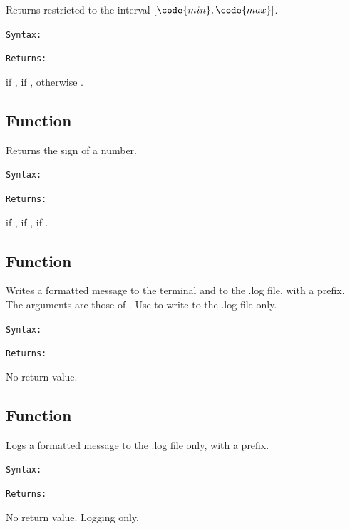 Returns  restricted to the interval $[\code{min}, \code{max}]$.

\medskip
\texttt{Syntax: }

\begin{center}
\end{center}

\medskip
\texttt{Returns: }

 if ,  if , otherwise .

\subsection{Function }
\label{sub:function_utils_sign}

Returns the sign of a number.

\medskip
\texttt{Syntax: }

\begin{center}
\end{center}

\medskip
\texttt{Returns: }

 if ,  if ,  if .

\subsection{Function }
\label{sub:function_utils_w}

Writes a formatted message to the terminal and to the .log file, with a
 prefix. The arguments are those of .
Use  to write to the .log file only.

\medskip
\texttt{Syntax: }

\begin{center}
\end{center}

\medskip
\texttt{Returns: }

No return value.

\subsection{Function }
\label{sub:function_utils_wlog}

Logs a formatted message to the .log file only, with a  prefix.

\medskip
\texttt{Syntax: }

\begin{center}
\end{center}

\medskip
\texttt{Returns: }

No return value. Logging only.
\endinput
